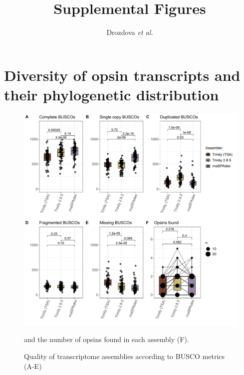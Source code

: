 \documentclass{article}
\begin{document}
	
\title{Supplemental Figures} %
\author{Drozdova \textit{et al.}} %
\maketitle

\section{Diversity of opsin transcripts and their phylogenetic distribution}

\begin{figure}[H] 
\includegraphics[scale=1]{./FigS1_assembly_comparison.pdf}
	\caption{Quality of transcriptome assemblies according to BUSCO metrics (A-E)} and the number of opsins found in each assembly (F). \end{figure}
\end{document}
